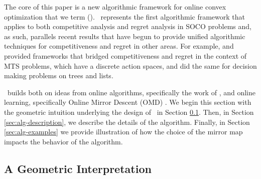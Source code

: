 






The core of this paper is a new algorithmic framework for online convex optimization that we term \emph{\ouralg} (\ourack). \ourack\ represents the first algorithmic framework that applies to both competitive analysis and regret analysis in SOCO problems and, as such, parallels recent results that have begun to provide unified algorithmic techniques for competitiveness and regret in other areas.  For example,  \cite{buchbinder2012unified} and \cite{Blum2000} provided frameworks that bridged competitiveness and regret in the context of MTS problems, which have a discrete action spaces, and \cite{blum2002static} did the same for decision making problems on trees and lists. 

\ourack\ builds both on ideas from online algorithms, specifically the work of \cite{bansal2015}, and online learning, specifically Online Mirror Descent (OMD) \citep{nemirovskii1983problem, warmuth1997continuous, bubeck2015}.  We begin this section with the geometric intuition underlying the design of \ourack\ in Section \ref{sec:alg-geometry}.  Then, in Section \ref{sec:alg-description}, we describe the details of the algorithm. Finally, in Section \ref{sec:alg-examples} we provide illustration of how the choice of the mirror map impacts the behavior of the algorithm. 

\subsection{A Geometric Interpretation}
\label{sec:alg-geometry}

